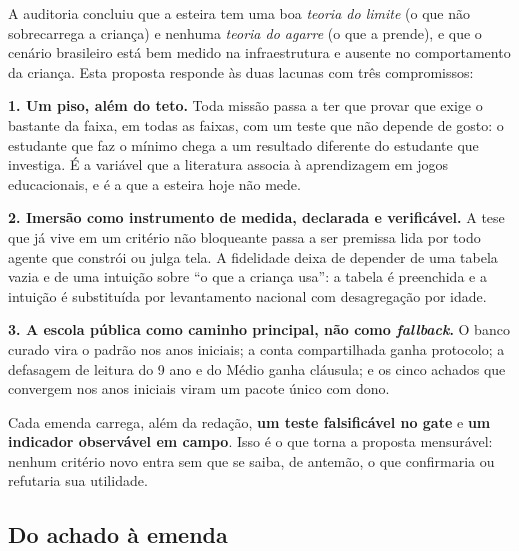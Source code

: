 \documentclass[11pt,a4paper]{article}
\begin{document}
A auditoria concluiu que a esteira tem uma boa \emph{teoria do limite} (o que não sobrecarrega a
criança) e nenhuma \emph{teoria do agarre} (o que a prende), e que o cenário brasileiro está bem
medido na infraestrutura e ausente no comportamento da criança. Esta proposta responde às duas
lacunas com três compromissos:

\begin{tesebox}
\textbf{1. Um piso, além do teto.} Toda missão passa a ter que provar que exige o bastante da
faixa, em todas as faixas, com um teste que não depende de gosto: o estudante que faz o mínimo
chega a um resultado diferente do estudante que investiga. É a variável que a literatura associa à
aprendizagem em jogos educacionais, e é a que a esteira hoje não mede.

\textbf{2. Imersão como instrumento de medida, declarada e verificável.} A tese que já vive em um
critério não bloqueante passa a ser premissa lida por todo agente que constrói ou julga tela. A
fidelidade deixa de depender de uma tabela vazia e de uma intuição sobre ``o que a criança usa'': a
tabela é preenchida e a intuição é substituída por levantamento nacional com desagregação por
idade.

\textbf{3. A escola pública como caminho principal, não como \emph{fallback}.} O banco curado
vira o padrão nos anos iniciais; a conta compartilhada ganha protocolo; a defasagem de leitura do
9\textordmasculine{} ano e do Médio ganha cláusula; e os cinco achados que convergem nos anos
iniciais viram um pacote único com dono.
\end{tesebox}

Cada emenda carrega, além da redação, \textbf{um teste falsificável no gate} e \textbf{um
indicador observável em campo}. Isso é o que torna a proposta mensurável: nenhum critério novo
entra sem que se saiba, de antemão, o que confirmaria ou refutaria sua utilidade.

\subsection{Do achado à emenda}
\end{document}
